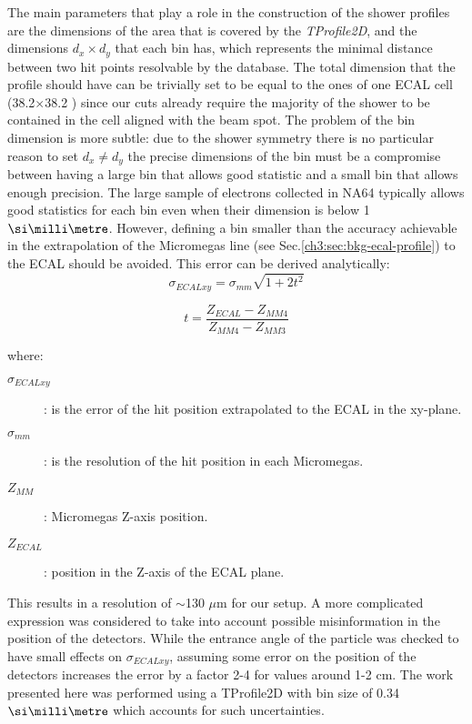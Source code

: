 The main parameters that play a role in the construction of the shower
profiles are the dimensions of the area that is covered by the
\textit{TProfile2D}, and the dimensions $d_x \times d_y$ that each bin has,
which represents the minimal distance between two hit points resolvable by the database.  The total dimension that the profile
should have can be trivially set to be equal to the ones of one ECAL
cell (38.2$\times$38.2 \mms) since our cuts already require the majority of the shower to be contained in the cell aligned with the beam spot. The problem of the bin dimension is
more subtle: due to the shower symmetry there is no particular reason
to set $d_x \neq d_y$ the precise dimensions of the bin must be a
compromise between having a large bin that allows good statistic and a
small bin that allows enough precision. The large sample of electrons
collected in NA64 typically allows good statistics for each bin even
when their dimension is below 1 $\mmi$. However, defining a bin smaller
than the accuracy achievable in the extrapolation of the Micromegas line (see Sec.\ref{ch3:sec:bkg-ecal-profile}) to the ECAL should be avoided. This error can be
derived analytically:
\begin{equation}
  \sigma_{ECALxy} = \sigma_{mm}\sqrt{1+2t^2}
  \label{eqn:MMerror}
\end{equation}

\begin{equation}
  t = \frac{Z_{ECAL}-Z_{MM4}}{Z_{MM4}-Z_{MM3}}
  \label{eqn:T}
\end{equation}

where:
\begin{description}
\item[$\sigma_{ECALxy}$]: is the error of the hit position
  extrapolated to the ECAL in the xy-plane.
\item[$\sigma_{mm}$]: is the resolution of the hit position in each
  Micromegas.
\item[$Z_{MM}$]: Micromegas Z-axis position.
\item[$Z_{ECAL}$]: position in the Z-axis of the ECAL plane.
\end{description}

This results in a resolution of $\sim$130 $\mu$m for our setup. A more
complicated expression was considered to take into account possible
misinformation in the position of the detectors. While the 
entrance angle of the particle was checked to have small effects on
$\sigma_{ECALxy}$, assuming some error on the position of the
detectors increases the error by a factor 2-4 for values around 1-2
\si{\centi\meter}. The work presented here was performed using a TProfile2D
with bin size of 0.34 $\mmi$ which accounts for such uncertainties.

